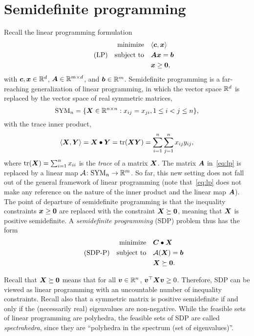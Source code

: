\section{Semidefinite programming}
Recall the linear programming formulation
\begin{align}\label{eq:lp}\tag{LP}
\begin{split}
 \text{minimize}\quad & \langle {\bm{c}}, {\bm{x}} \rangle\\
 \quad\text{subject to}\quad & \bm{A}\bm{x}=\bm{b}\\
 & \bm{x}\geq \bm{0},
 \end{split}
\end{align}
with $\bm{c},\bm{x}\in \mathbb{R}^d$, $\bm{A}\in \mathbb{R}^{m\times d}$, and $\bm{b}\in \mathbb{R}^m$. 
Semidefinite programming is a far-reaching generalization of linear programming, in which the vector space $\mathbb{R}^d$ is replaced by the vector space of real symmetric matrices,
\begin{equation*}
 \mathrm{SYM}_n = \{\bm{X}\in \mathbb{R}^{n\times n} \mathrel{\mathop{:}} x_{ij}=x_{ji}, 1\leq i<j\leq n\},
\end{equation*}
with the trace inner product,
\begin{equation*}
 \langle {\bm{X}}, {\bm{Y}} \rangle = \bm{X}\bullet\bm{Y} = \mathrm{tr}(\bm{X}\bm{Y}) = \sum_{i=1}^n \sum_{j=1}^n x_{ij}y_{ij},
\end{equation*}
where $\mathrm{tr}(\bm{X})=\sum_{i=1}^n x_{ii}$ is the {\em trace} of a matrix $\bm{X}$. 
The matrix $\bm{A}$ in~\eqref{eq:lp} is replaced by a linear map $\mathcal{\bm{A}}\colon \mathrm{SYM}_n\to \mathbb{R}^m$. So far, this new setting does not fall out of the general framework of linear programming (note that~\eqref{eq:lp} does not make any reference on the nature of the inner product and the linear map $\bm{A}$). The point of departure of semidefinite programming is that the inequality constraints $\bm{x}\geq \bm{0}$ are replaced with the constraint $\bm{X} \succeq\bm{0}$, meaning that $\bm{X}$ is positive semidefinite. A {\em semidefinite programming} (SDP) problem thus has the form
\begin{align}\label{eq:sdp-p}\tag{SDP-P}
\begin{split}
 \text{minimize}\quad & \bm{C}\bullet \bm{X}\\
 \quad\text{subject to}\quad & \mathcal{\bm{A}}(\bm{X})=\bm{b}\\
 & \bm{X} \succeq \bm{0}.
 \end{split}
\end{align}

\begin{remark}\label{re:1}
 Recall that $\bm{X}\succeq \bm{0}$ means that for all $\bm{v}\in \mathbb{R}^n$, $\bm{v}^{\top}\bm{X}\bm{v}\geq 0$. Therefore, SDP can be viewed as linear programming with an uncountable number of inequality constraints. Recall also that a symmetric matrix is positive semidefinite if and only if the (necessarily real) eigenvalues are non-negative. While the feasible sets of linear programming are polyhedra, the feasible sets of SDP are called {\em spectrahedra}, since they are ``polyhedra in the spectrum (set of eigenvalues)''.
\end{remark}

